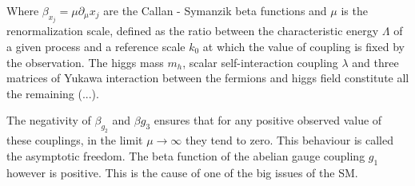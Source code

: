 \documentclass[11pt, a4paper]{article}
\begin{document}
Where $\beta_{x_j} = \mu \partial_\mu x_j$ are the Callan - Symanzik beta functions and $\mu$ is the renormalization scale, defined as the ratio between the characteristic energy $\Lambda$ of a given process and a reference scale $k_0$ at which the value of coupling is fixed by the observation.
The higgs mass $m_h$, scalar self-interaction coupling $\lambda$ and three matrices of Yukawa interaction between the fermions and higgs field constitute all the remaining (...).

The negativity of $\beta_{g_2}$ and $\beta{g_3}$ ensures that for any positive observed value of these couplings, in the limit $\mu \rightarrow \infty$ they tend to zero. This behaviour is called the asymptotic freedom.
The beta function of the abelian gauge coupling $g_1$ however is positive.
This is the cause of one of the big issues of the SM.
\end{document}
